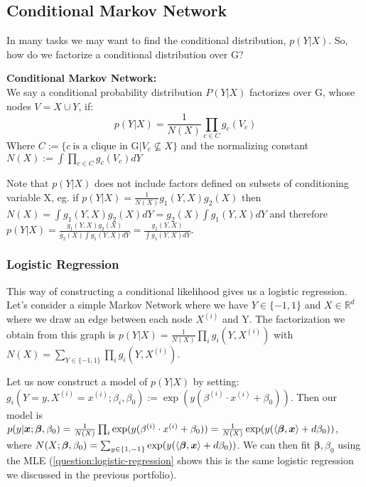 \subsection{Conditional Markov Network}
In many tasks we may want to find the conditional distribution, $p(Y|X)$. So, how do we factorize a conditional distribution over G?
\begin{definition}
    \textbf{Conditional Markov Network:} \\
    We say a conditional probability distribution $P(Y|X)$ factorizes over G, whose nodes $V=X \cup Y$, if:
    \begin{equation}
        p(Y|X) = \frac{1}{N(X)} \prod_{c \in C} g_{c}(V_{c})
    \end{equation}
    Where $C:= \{c \: \text{is a clique in G} | V_{c} \nsubseteq X \}$ and the normalizing constant $N(X) := \int \prod_{c \in C} g_{c}(V_{c}) dY$
\end{definition}
Note that $p(Y|X)$ does not include factors defined on subsets of conditioning variable X, eg. if $p(Y|X) = \frac{1}{N(X)} g_{1}(Y,X) g_{2}(X)$ then $N(X)=\int g_{1}(Y,X) g_{2}(X)dY= g_{2}(X) \int g_{1}(Y,X) dY$ and therefore $p(Y|X) = \frac{g_{1}(Y,X) g_{2}(X)}{g_{2}(X) \int g_{1}(Y,X) dY} = \frac{g_{1}(Y,X)}{\int g_{1}(Y,X)dY}$.

\subsubsection{Logistic Regression}\label{subsubsection:Logistic-Regression}
This way of constructing a conditional likelihood gives us a logistic regression. Let's consider a simple Markov Network where we have $Y \in \{-1,1\}$ and $X \in \mathbb{R}^{d}$ where we draw an edge between each node $X^{(i)}$ and Y. The factorization we obtain from this graph is $p(Y|X) = \frac{1}{N(X)} \prod_{i} g_{i}(Y,X^{(i)})$ with $N(X)= \sum_{Y \in \{-1,1\}} \prod_{i} g_{i}(Y,X^{(i)})$.

Let us now construct a model of $p(Y|X)$ by setting: $g_{i}(Y=y,X^{(i)}=x^{(i)}; \beta_{i}, \beta_{0}) := \exp(y(\beta^{(i)} \cdot x^{(i)} + \beta_{0}))$. Then our model is $p(y|\bm{x} ; \bm{\beta}, \beta_{0}) = \frac{1}{N(X)} \prod_{i} \exp(y(\beta^{(i)} \cdot x^{(i)} + \beta_{0})) = \frac{1}{N(X)} \exp(y(\langle \bm{\beta}, \bm{x} \rangle + d\beta_{0}))$, where $N(X;\bm{\beta},\beta_{0}) = \sum_{y \in \{1,-1\} } \exp(y(\langle \bm{\beta} , \bm{x} \rangle + d\beta_{0}))$. We can then fit $\bm{\beta},\beta_{0}$ using the MLE (\cref{question:logistic-regression} shows this is the same logistic regression we discussed in the previous portfolio).
